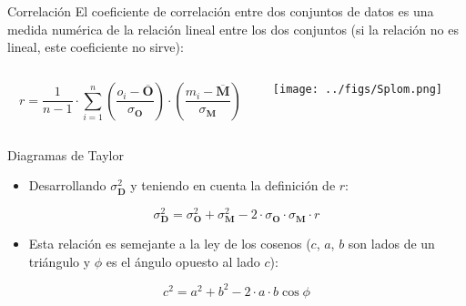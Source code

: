 \documentclass[aspectratio=169, usenames,svgnames,dvipsnames]{beamer}
\begin{document}
\begin{frame}[label={sec:org0747d7a}]{Correlación}
El coeficiente de correlación entre dos conjuntos de datos es una
medida numérica de la relación \alert{lineal} entre los dos conjuntos (si la
relación no es lineal, este coeficiente no sirve):

\begin{columns}
\begin{column}{0.5\columnwidth}
\[
r = \frac{1}{n-1} \cdot \sum_{i=1}^{n} \left( \frac{o_{i}-\overline{\mathbf{O}}}{\sigma_{\mathbf{O}}}\right) \cdot \left(\frac{m_{i}-\overline{\mathbf{M}}}{\sigma_{\mathbf{M}}}\right)
\]
\end{column}

\begin{column}{0.5\columnwidth}
\begin{center}
\texttt{[image: ../figs/Splom.png]}
\end{center}
\end{column}
\end{columns}
\end{frame}


\begin{frame}[label={sec:org394ccbd}]{Diagramas de Taylor}
\begin{itemize}
\item Desarrollando \(\sigma^2_{\mathbf{D}}\) y teniendo en cuenta la definición de \(r\):
\end{itemize}

  \[
  \sigma^2_{\mathbf{D}} = \sigma^2_{\mathbf{O}}  + \sigma^2_{\mathbf{M}}
- 2 \cdot \sigma_{\mathbf{O}} \cdot \sigma_{\mathbf{M}} \cdot r
  \]
\begin{itemize}
\item Esta relación es semejante a la ley de los cosenos (\(c\), \(a\), \(b\) son lados de un triángulo y \(\phi\) es el ángulo opuesto al lado \(c\)):
\end{itemize}

\[
c^2 = a^2 + b^2 - 2 \cdot a \cdot b \cos\phi
\]
\nocite{Taylor2000}
\end{frame}
\end{document}
